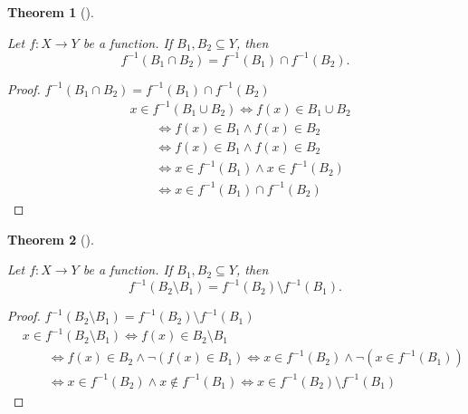 \documentclass[
  letterpaper,
  10pt,
  reqno,
  twopage,
  openany]{book}
\theoremstyle{plain}
\theoremstyle{definition}
\theoremstyle{definition}
\theoremstyle{definition}
\theoremstyle{plain}
\theoremstyle{plain}
\newtheorem{theorem}{Theorem}[chapter]
\theoremstyle{remark}
\begin{document}
\leavevmode{}%
\begin{theorem}[]\label{thm-function-cap-subseteq}

Let \(f:X\to Y\) be a function. If \(B_1, B_2\subseteq Y\), then \[
f^{-1}(B_1\cap B_2)=f^{-1}(B_1)\cap f^{-1}(B_2).
\]

\end{theorem}

\begin{proof}

\(f^{-1}(B_1\cap B_2)=f^{-1}(B_1)\cap f^{-1}(B_2)\) \begin{align*}
& x\in f^{-1}(B_1\cup B_2) \Leftrightarrow f(x)\in B_1\cup B_2 \\
& \qquad \Leftrightarrow f(x)\in B_1 \land f(x)\in B_2 \\ 
& \qquad \Leftrightarrow f(x)\in B_1 \land f(x)\in B_2 \\ 
& \qquad \Leftrightarrow x\in f^{-1}(B_1) \land x\in f^{-1}(B_2) \\ 
& \qquad \Leftrightarrow x\in f^{-1}(B_1)\cap f^{-1}(B_2)
\end{align*}

\end{proof}

\leavevmode{}%
\begin{theorem}[]\label{thm-function-setminus-subseteq}

Let \(f:X\to Y\) be a function. If \(B_1, B_2\subseteq Y\), then \[
f^{-1}(B_2\setminus B_1)=f^{-1}(B_2)\setminus f^{-1}(B_1).
\]

\end{theorem}

\begin{proof}

\(f^{-1}(B_2\setminus B_1)=f^{-1}(B_2)\setminus f^{-1}(B_1)\)
\begin{align*}
& x\in f^{-1}(B_2\setminus B_1)
\Leftrightarrow   f(x)\in B_2\setminus B_1 
\\ & \qquad 
\Leftrightarrow  f(x)\in B_2 \land \neg(f(x)\in B_1) 
\Leftrightarrow   x\in f^{-1}(B_2) \land \neg (x\in f^{-1}(B_1))
\\ & \qquad 
\Leftrightarrow   x\in f^{-1}(B_2) \land x\not\in f^{-1}(B_1) 
\Leftrightarrow   x\in f^{-1}(B_2) \setminus f^{-1}(B_1)
\end{align*}

\end{proof}
\end{document}
